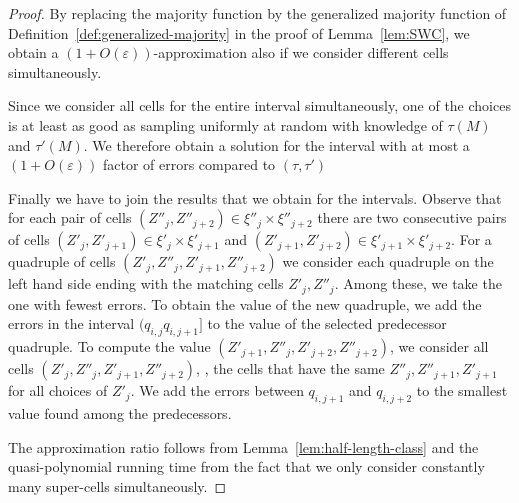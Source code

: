 \begin{proof}
    By replacing the majority function by the generalized majority function of Definition~\ref{def:generalized-majority} in the proof of Lemma~\ref{lem:SWC}, we obtain a $(1 + O(\varepsilon))$-approximation
    also if we consider different cells simultaneously.

    Since we consider all cells for the entire interval simultaneously, one of the choices is at least as good as sampling uniformly at random with knowledge of $\tau(M)$ and $\tau'(M)$.
    We therefore obtain a solution for the interval with at most a $(1+O(\varepsilon))$ factor of errors compared to $(\tau,\tau')$

    Finally we have to join the results that we obtain for the intervals.
    Observe that for each pair of cells $(Z''_j,Z''_{j+2}) \in \xi''_j \times \xi''_{j+2}$ there are two consecutive pairs of cells
    $(Z'_j,Z'_{j+1}) \in \xi'_j \times \xi'_{j+1}$ and $(Z'_{j+1}, Z'_{j+2}) \in \xi'_{j+1} \times \xi'_{j+2}$.
    For a quadruple of cells $(Z'_j,Z''_j,Z'_{j+1},Z''_{j+2})$ we consider each quadruple on the left hand side ending with the matching cells $Z'_j,Z''_j$.
    Among these, we take the one with fewest errors.
    To obtain the value of the new quadruple, we add the errors in the interval $(q_{i,j} q_{i,j+1}]$ to the value of the selected predecessor quadruple.
    To compute the value $(Z'_{j+1},Z''_j,Z'_{j+2},Z''_{j+2})$, we consider all cells $(Z'_j,Z''_j,Z'_{j+1},Z''_{j+2})$, \ie, the cells that have the same $Z''_{j},Z''_{j+1},Z'_{j+1}$ for all choices of $Z'_j$.
    We add the errors between $q_{i,j+1}$ and $q_{i,j+2}$ to the smallest value found among the predecessors.

    The approximation ratio follows from Lemma~\ref{lem:half-length-class} and the quasi-polynomial running time from the fact that we only consider constantly many super-cells simultaneously.

\end{proof}

